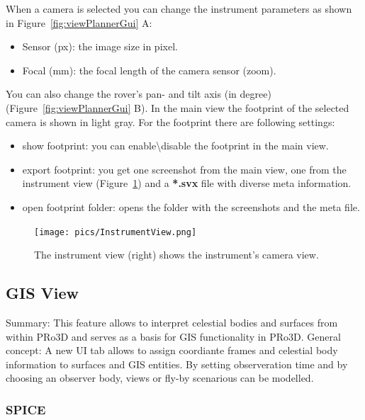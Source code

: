 When a camera is selected you can change the instrument parameters as shown in Figure~\ref{fig:viewPlannerGui} A:
\begin{itemize}
	\item Sensor (px): the image size in pixel.
	\item Focal (mm): the focal length of the camera sensor (zoom).
\end{itemize}
You can also change the rover's pan- and tilt axis (in degree) (Figure~\ref{fig:viewPlannerGui} B).
In the main view the footprint of the selected camera is shown in light gray. For the footprint there are following settings:
\begin{itemize}
	\item show footprint: you can enable\textbackslash disable the footprint in the main view.
	\item export footprint: you get one screenshot from the main view, one from the instrument view (Figure~\ref{fig:instView}) and a \textbf{*.svx} file with diverse meta information.
	\item open footprint folder: opens the folder with the screenshots and the meta file.
\end{itemize}
\begin{figure}[h]
    	\centering
    		\texttt{[image: pics/InstrumentView.png]}
    	\caption[Instrument View]{The instrument view (right) shows the instrument's camera view.}
    	\label{fig:instView}
   \end{figure}

\newpage
\subsection{GIS View}
\label{sec:gisview}

    
Summary: This feature allows to interpret celestial bodies and surfaces
from within PRo3D and serves as a basis for GIS functionality in PRo3D.
General concept: A new UI tab allows to assign coordiante frames and
celestial body information to surfaces and GIS entities. By setting
observeration time and by choosing an observer body, views or fly-by
scenarious can be modelled.

\hypertarget{spice}{%
	\subsubsection{SPICE}\label{spice}}

